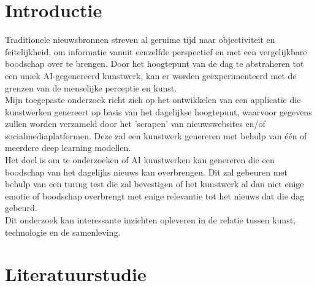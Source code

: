
\section{Introductie}%
\label{sec:introductie}
\noindent
Traditionele nieuwsbronnen streven al geruime tijd naar objectiviteit en feitelijkheid, om informatie vanuit eenzelfde perspectief en met een vergelijkbare boodschap over te brengen. Door het hoogtepunt van de dag te abstraheren tot een uniek AI-gegenereerd kunstwerk, kan er worden geëxperimenteerd met de grenzen van de menselijke perceptie en kunst. \\
\noindent
Mijn toegepaste onderzoek richt zich op het ontwikkelen van een applicatie die kunstwerken genereert op basis van het dagelijkse hoogtepunt, waarvoor gegevens zullen worden verzameld door het 'scrapen' van nieuwswebsites en/of socialmediaplatformen.
Deze zal een kunstwerk genereren met behulp van één of meerdere deep learning modellen. \\
\noindent
Het doel is om te onderzoeken of AI kunstwerken kan genereren die een boodschap van het dagelijks nieuws kan overbrengen. Dit zal gebeuren met behulp van een turing test die zal bevestigen of het kunstwerk al dan niet enige emotie of boodschap overbrengt met enige relevantie tot het nieuws dat die dag gebeurd.\\
\noindent
Dit onderzoek kan interessante inzichten opleveren in de relatie tussen kunst, technologie en de samenleving.


\section{Literatuurstudie}%
